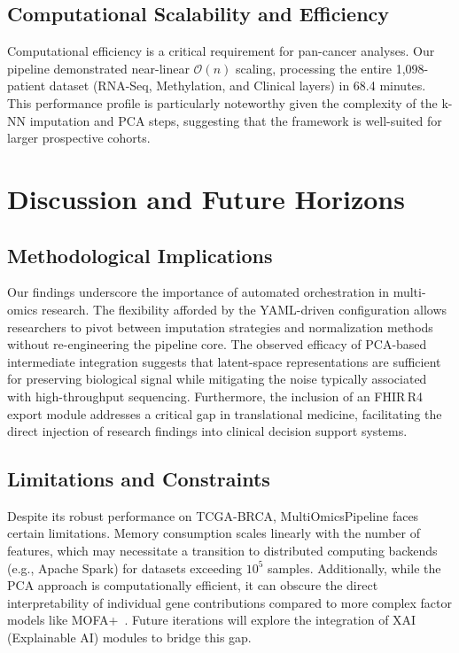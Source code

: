 \documentclass[sigconf,nonacm]{acmart}
\begin{document}
\subsection{Computational Scalability and Efficiency}
Computational efficiency is a critical requirement for pan-cancer analyses. Our pipeline demonstrated near-linear $\mathcal{O}(n)$ scaling, processing the entire 1,098-patient dataset (RNA-Seq, Methylation, and Clinical layers) in 68.4 minutes. This performance profile is particularly noteworthy given the complexity of the k-NN imputation and PCA steps, suggesting that the framework is well-suited for larger prospective cohorts.

\section{Discussion and Future Horizons}

\subsection{Methodological Implications}
Our findings underscore the importance of automated orchestration in multi-omics research. The flexibility afforded by the YAML-driven configuration allows researchers to pivot between imputation strategies and normalization methods without re-engineering the pipeline core. The observed efficacy of PCA-based intermediate integration suggests that latent-space representations are sufficient for preserving biological signal while mitigating the noise typically associated with high-throughput sequencing. Furthermore, the inclusion of an FHIR\,R4 export module addresses a critical gap in translational medicine, facilitating the direct injection of research findings into clinical decision support systems.

\subsection{Limitations and Constraints}
Despite its robust performance on TCGA-BRCA, MultiOmicsPipeline faces certain limitations. Memory consumption scales linearly with the number of features, which may necessitate a transition to distributed computing backends (e.g., Apache Spark) for datasets exceeding $10^5$ samples. Additionally, while the PCA approach is computationally efficient, it can obscure the direct interpretability of individual gene contributions compared to more complex factor models like MOFA+~\cite{argelaguet2018}. Future iterations will explore the integration of XAI (Explainable AI) modules to bridge this gap.
\end{document}
